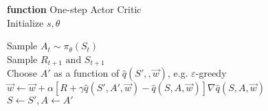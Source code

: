 \documentclass{standalone}
\begin{document}
\pagestyle{empty}
\begin{algorithm}[H]
  \textbf{function} One-step Actor Critic \\
  	Initialize $s, \theta$ \\

  	 {
  	Sample $A_t \sim \pi_\theta(S_t)$ \\
  	Sample $R_{t+1} \text{ and } S_{t+1}$ \\

  	Choose $A'$ as a function of $\hat{q}(S', ,\vec{w})$, e.g. $\varepsilon$-greedy\\
  	$\vec{w} \leftarrow \vec{w} + \alpha [R + \gamma \hat{q}(S',A',\vec{w}) -\hat{q}(S,A,\vec{w})]\nabla\hat{q}(S,A,\vec{w})$\\
  	$S \leftarrow S', A \leftarrow A'$
  
}

\end{algorithm}
\end{document}
